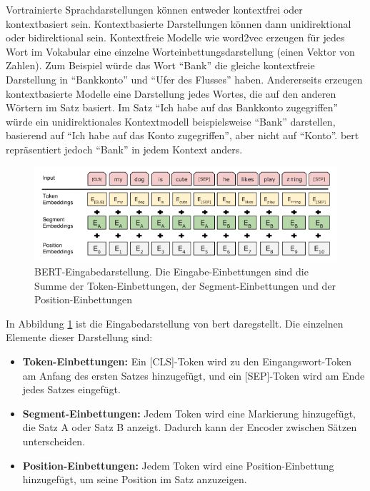 \documentclass[
        ngerman,
        paper=a4,
        numbers=noendperiod,
]{scrreprt}
\begin{document}
Vortrainierte Sprachdarstellungen können entweder kontextfrei oder kontextbasiert sein. Kontextbasierte Darstellungen können dann unidirektional oder bidirektional sein. Kontextfreie Modelle wie word2vec erzeugen für jedes Wort im Vokabular eine einzelne Worteinbettungsdarstellung (einen Vektor von Zahlen). Zum Beispiel würde das Wort \enquote{Bank} die gleiche kontextfreie Darstellung in \enquote{Bankkonto} und \enquote{Ufer des Flusses} haben. Andererseits erzeugen kontextbasierte Modelle eine Darstellung jedes Wortes, die auf den anderen Wörtern im Satz basiert. Im Satz \enquote{Ich habe auf das Bankkonto zugegriffen} würde ein unidirektionales Kontextmodell beispielsweise \enquote{Bank} darstellen, basierend auf \enquote{Ich habe auf das Konto zugegriffen}, aber nicht auf \enquote{Konto}. \ac{bert} repräsentiert jedoch \enquote{Bank} in jedem Kontext anders.


\begin{figure}[H]
    \centering\includegraphics[width=1\linewidth]{images/bert1.png}
    \caption[BERT-Eingabedarstellung]{BERT-Eingabedarstellung. Die Eingabe-Einbettungen sind die Summe der Token-Einbettungen, der Segment-Einbettungen  und der Position-Einbettungen \citep{Devlin2018BERT:Understanding}}
    \label{fig:bert1}
\end{figure}

In Abbildung \ref{fig:bert1} ist die Eingabedarstellung von \ac{bert} daregstellt. Die einzelnen Elemente dieser Darstellung sind:
\begin{itemize}
    \item \textbf{Token-Einbettungen:} Ein [CLS]-Token wird zu den Eingangswort-Token am Anfang des ersten Satzes hinzugefügt, und ein [SEP]-Token wird am Ende jedes Satzes eingefügt.
    \item \textbf{Segment-Einbettungen:} Jedem Token wird eine Markierung hinzugefügt, die Satz A oder Satz B anzeigt. Dadurch kann der Encoder zwischen Sätzen unterscheiden.
    \item \textbf{Position-Einbettungen:} Jedem Token wird eine Position-Einbettung hinzugefügt, um seine Position im Satz anzuzeigen.
\end{itemize}
\end{document}
